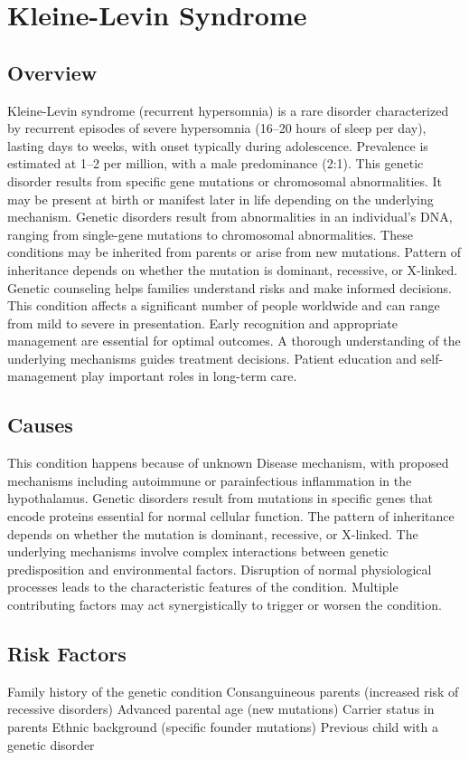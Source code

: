 \chapter{Kleine-Levin Syndrome}
\label{sec:Kleine-Levin Syndrome}

\section{Overview}
Kleine-Levin syndrome (recurrent hypersomnia) is a rare disorder characterized by recurrent episodes of severe hypersomnia (16--20 hours of sleep per day), lasting days to weeks, with onset typically during adolescence. Prevalence is estimated at 1--2 per million, with a male predominance (2:1). This genetic disorder results from specific gene mutations or chromosomal abnormalities. It may be present at birth or manifest later in life depending on the underlying mechanism. Genetic disorders result from abnormalities in an individual's DNA, ranging from single-gene mutations to chromosomal abnormalities. These conditions may be inherited from parents or arise from new mutations. Pattern of inheritance depends on whether the mutation is dominant, recessive, or X-linked. Genetic counseling helps families understand risks and make informed decisions. This condition affects a significant number of people worldwide and can range from mild to severe in presentation. Early recognition and appropriate management are essential for optimal outcomes. A thorough understanding of the underlying mechanisms guides treatment decisions. Patient education and self-management play important roles in long-term care.
\section{Causes}
This condition happens because of unknown Disease mechanism, with proposed mechanisms including autoimmune or parainfectious inflammation in the hypothalamus. Genetic disorders result from mutations in specific genes that encode proteins essential for normal cellular function. The pattern of inheritance depends on whether the mutation is dominant, recessive, or X-linked. The underlying mechanisms involve complex interactions between genetic predisposition and environmental factors. Disruption of normal physiological processes leads to the characteristic features of the condition. Multiple contributing factors may act synergistically to trigger or worsen the condition.
\section{Risk Factors}
Family history of the genetic condition Consanguineous parents (increased risk of recessive disorders) Advanced parental age (new mutations) Carrier status in parents Ethnic background (specific founder mutations) Previous child with a genetic disorder

